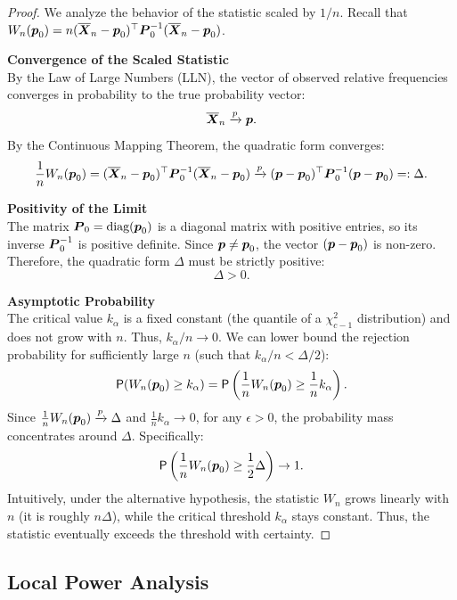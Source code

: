 \begin{proof}
    We analyze the behavior of the statistic scaled by $1/n$. Recall that $W_n(\boldsymbol{p}_0) = n(\overline{\boldsymbol{X}}_n - \boldsymbol{p}_0)^{\top} \boldsymbol{P}_0^{-1} (\overline{\boldsymbol{X}}_n - \boldsymbol{p}_0)$.
    
    \textbf{Convergence of the Scaled Statistic} \\
    By the Law of Large Numbers (LLN), the vector of observed relative frequencies converges in probability to the true probability vector:
    \[
        \overline{\boldsymbol{X}}_n \xrightarrow{p} \boldsymbol{p}.
    \]
    By the Continuous Mapping Theorem, the quadratic form converges:
    \[
        \frac{1}{n}W_n(\boldsymbol{p}_0) = (\overline{\boldsymbol{X}}_n - \boldsymbol{p}_0)^{\top} \boldsymbol{P}_0^{-1} (\overline{\boldsymbol{X}}_n - \boldsymbol{p}_0) \xrightarrow{p} (\boldsymbol{p} - \boldsymbol{p}_0)^{\top} \boldsymbol{P}_0^{-1} (\boldsymbol{p} - \boldsymbol{p}_0) =: \Delta.
    \]

    \textbf{Positivity of the Limit} \\
    The matrix $\boldsymbol{P}_0 = \text{diag}(\boldsymbol{p}_0)$ is a diagonal matrix with positive entries, so its inverse $\boldsymbol{P}_0^{-1}$ is positive definite. Since $\boldsymbol{p} \neq \boldsymbol{p}_0$, the vector $(\boldsymbol{p} - \boldsymbol{p}_0)$ is non-zero. Therefore, the quadratic form $\Delta$ must be strictly positive:
    \[
        \Delta > 0.
    \]

    \textbf{Asymptotic Probability} \\
    The critical value $k_\alpha$ is a fixed constant (the quantile of a $\chi^2_{c-1}$ distribution) and does not grow with $n$. Thus, $k_\alpha/n \to 0$.
    We can lower bound the rejection probability for sufficiently large $n$ (such that $k_\alpha/n < \Delta/2$):
    \[
        \mathsf{P}(W_n(\boldsymbol{p}_0) \ge k_\alpha) = \mathsf{P}\left(\frac{1}{n}W_n(\boldsymbol{p}_0) \ge \frac{1}{n}k_\alpha\right).
    \]
    Since $\frac{1}{n}W_n(\boldsymbol{p}_0) \xrightarrow{p} \Delta$ and $\frac{1}{n}k_\alpha \to 0$, for any $\epsilon > 0$, the probability mass concentrates around $\Delta$. Specifically:
    \[
        \mathsf{P}\left(\frac{1}{n}W_n(\boldsymbol{p}_0) \ge \frac{1}{2}\Delta\right) \to 1.
    \]
    Intuitively, under the alternative hypothesis, the statistic $W_n$ grows linearly with $n$ (it is roughly $n\Delta$), while the critical threshold $k_\alpha$ stays constant. Thus, the statistic eventually exceeds the threshold with certainty.
\end{proof}

\subsection{Local Power Analysis}
\label{sub:Local Power Analysis}

